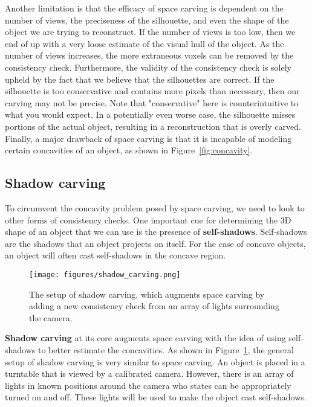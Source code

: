 \documentclass[a4paper, 12pt]{article}
\renewcommand\emph{\textbf}
\numberwithin{equation}{section}
\begin{document}
Another limitation is that the efficacy of space carving is dependent on the number of views, the preciseness of the silhouette, and even the shape of the object we are trying to reconstruct. If the number of views is too low, then we end of up with a very loose estimate of the visual hull of the object. As the number of views increases, the more extraneous voxels can be removed by the consistency check. Furthermore, the validity of the consistency check is solely upheld by the fact that we believe that the silhouettes are correct. If the silhouette is too conservative and contains more pixels than necessary, then our carving may not be precise. Note that "conservative" here is counterintuitive to what you would expect. In a potentially even worse case, the silhouette misses portions of the actual object, resulting in a reconstruction that is overly carved. Finally, a major drawback of space carving is that it is incapable of modeling certain concavities of an object, as shown in Figure~\ref{fig:concavity}.

\subsection{Shadow carving}
To circumvent the concavity problem posed by space carving, we need to look to other forms of consistency checks. One important cue for determining the 3D shape of an object that we can use is the presence of \emph{self-shadows}. Self-shadows are the shadows that an object projects on itself. For the case of concave objects, an object will often cast self-shadows in the concave region. 

\begin{figure}[h!]
    \centering
    \texttt{[image: figures/shadow\_carving.png]}
    \caption{The setup of shadow carving, which augments space carving by adding a new consistency check from an array of lights surrounding the camera.}
    \label{fig:shadow_carving}
\end{figure}

\emph{Shadow carving} at its core augments space carving with the idea of using self-shadows to better estimate the concavities. As shown in Figure~\ref{fig:shadow_carving}, the general setup of shadow carving is very similar to space carving. An object is placed in a turntable that is viewed by a calibrated camera. However, there is an array of lights in known positions around the camera who states can be appropriately turned on and off. These lights will be used to make the object cast self-shadows.
\end{document}
